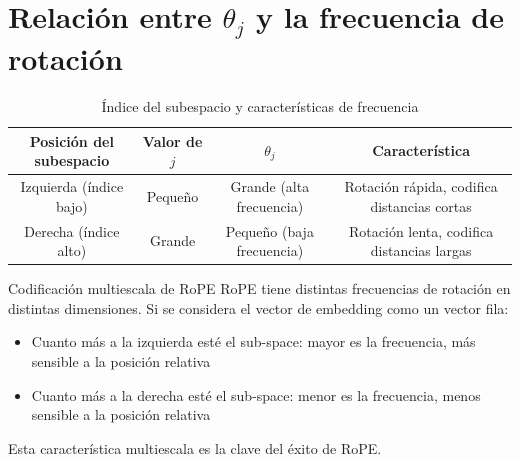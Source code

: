 \section{Relación entre $\theta_j$ y la frecuencia de rotación}

\begin{table}[H]
\centering
\caption{Índice del subespacio y características de frecuencia}
\begin{tabular}{cccc}
\toprule
\textbf{Posición del subespacio} & \textbf{Valor de $j$} & \textbf{$\theta_j$} & \textbf{Característica} \\
\midrule
Izquierda (índice bajo) & Pequeño & Grande (alta frecuencia) & Rotación rápida, codifica distancias cortas \\
Derecha (índice alto) & Grande & Pequeño (baja frecuencia) & Rotación lenta, codifica distancias largas \\
\bottomrule
\end{tabular}
\end{table}

\begin{knowledgebox}{Codificación multiescala de RoPE}
RoPE tiene distintas frecuencias de rotación en distintas dimensiones. Si se considera el vector de embedding como un vector fila:
\begin{itemize}
  \item Cuanto más a la izquierda esté el sub-space: mayor es la frecuencia, más sensible a la posición relativa
  \item Cuanto más a la derecha esté el sub-space: menor es la frecuencia, menos sensible a la posición relativa
\end{itemize}
Esta característica multiescala es la clave del éxito de RoPE.
\end{knowledgebox}

